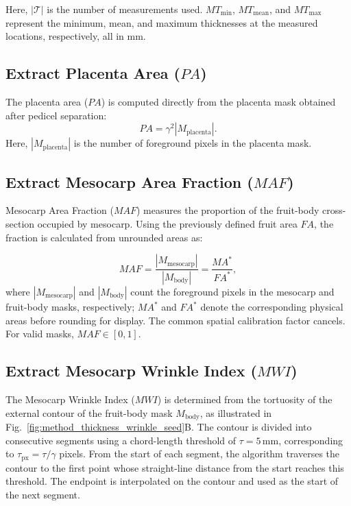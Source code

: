 \documentclass[final,5p,times,twocolumn]{elsarticle}
\begin{document}
Here, $|\mathcal{T}|$ is the number of measurements used. $MT_{\min}$, $MT_{\mathrm{mean}}$, and $MT_{\max}$ represent the minimum, mean, and maximum thicknesses at the measured locations, respectively, all in mm.

\subsection*{Extract Placenta Area ($PA$)}
The placenta area ($PA$) is computed directly from the placenta mask obtained after pedicel separation:
\begin{equation}
 PA=\gamma^2|M_{\mathrm{placenta}}|.
\end{equation}
Here, $|M_{\mathrm{placenta}}|$ is the number of foreground pixels in the placenta mask.

\subsection*{Extract Mesocarp Area Fraction ($MAF$)}

Mesocarp Area Fraction ($MAF$) measures the proportion of the fruit-body cross-section occupied by mesocarp. Using the previously defined fruit area $FA$, the fraction is calculated from unrounded areas as:

\begin{equation}
 MAF=\frac{|M_{\mathrm{mesocarp}}|}{|M_{\mathrm{body}}|}=\frac{MA^*}{FA^*},
\end{equation}
where $|M_{\mathrm{mesocarp}}|$ and $|M_{\mathrm{body}}|$ count the foreground pixels in the mesocarp and fruit-body masks, respectively; $MA^*$ and $FA^*$ denote the corresponding physical areas before rounding for display. The common spatial calibration factor cancels. For valid masks, $MAF\in[0,1]$.


\subsection*{Extract Mesocarp Wrinkle Index ($MWI$)}

The Mesocarp Wrinkle Index ($MWI$) is determined from the tortuosity of the external contour of the fruit-body mask $M_{\mathrm{body}}$, as illustrated in Fig.~\ref{fig:method_thickness_wrinkle_seed}B. The contour is divided into consecutive segments using a chord-length threshold of $\tau=5\,\mathrm{mm}$, corresponding to $\tau_{\mathrm{px}}=\tau/\gamma$ pixels. From the start of each segment, the algorithm traverses the contour to the first point whose straight-line distance from the start reaches this threshold. The endpoint is interpolated on the contour and used as the start of the next segment.
\end{document}

